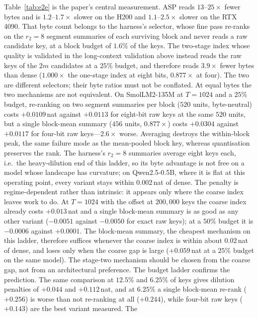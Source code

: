 \documentclass[sigconf,nonacm,11pt]{acmart}
\begin{document}
Table~\ref{tab:e2e} is the paper's central measurement. ASP reads $13$--$25\times$
fewer bytes and is $1.2$--$1.7\times$ slower on the H200 and $1.1$--$2.5\times$
slower on the RTX 4090. That byte count belongs to the harness's selector, whose fine pass re-ranks on the
$r_2=8$ segment summaries of each surviving block and never reads a raw candidate
key, at a block budget of $1.6\%$ of the keys. The two-stage index whose quality is
validated in the long-context validation above instead reads the raw keys of the $2m$
candidates at a $25\%$ budget, and therefore reads $3.9\times$ fewer bytes than
dense ($1.000\times$ the one-stage index at eight bits, $0.877\times$ at four). The
two are different selectors; their byte ratios must not be conflated. At equal bytes the two mechanisms are not equivalent. On SmolLM2-135M at
$T=1024$ and a $25\%$ budget, re-ranking on two segment summaries per block ($520$
units, byte-neutral) costs $+0.0109$\,nat against $+0.0113$ for eight-bit raw keys
at the same $520$ units, but a single block-mean summary ($456$ units, $0.877\times$)
costs $+0.0304$ against $+0.0117$ for four-bit raw keys---$2.6\times$ worse.
Averaging destroys the within-block peak, the same failure mode as the mean-pooled
block key, whereas quantisation preserves the rank. The harness's $r_2=8$ summaries
average eight keys each, i.e.\ the heavy-dilution end of this ladder, so its byte
advantage is not free on a model whose landscape has curvature; on Qwen2.5-0.5B,
where it is flat at this operating point, every variant stays within $0.002$\,nat of
dense. The penalty is regime-dependent rather than intrinsic: it appears only where the
coarse index leaves work to do. At $T=1024$ with the offset at $200{,}000$ keys the
coarse index already costs $+0.013$\,nat and a single block-mean summary is as good
as any other variant ($-0.0051$ against $-0.0050$ for exact raw keys); at a $50\%$
budget it is $-0.0006$ against $+0.0001$. The block-mean summary, the cheapest
mechanism on this ladder, therefore suffices whenever the coarse index is within
about $0.02$\,nat of dense, and loses only when the coarse gap is large ($+0.059$\,nat
at a $25\%$ budget on the same model). The stage-two mechanism should be chosen from
the coarse gap, not from an architectural preference. The budget ladder confirms the prediction. The same comparison at $12.5\%$ and
$6.25\%$ of keys gives dilution penalties of $+0.044$ and $+0.112$\,nat, and at
$6.25\%$ a single block-mean re-rank ($+0.256$) is worse than not re-ranking at all
($+0.244$), while four-bit raw keys ($+0.143$) are the best variant measured. The
\end{document}
